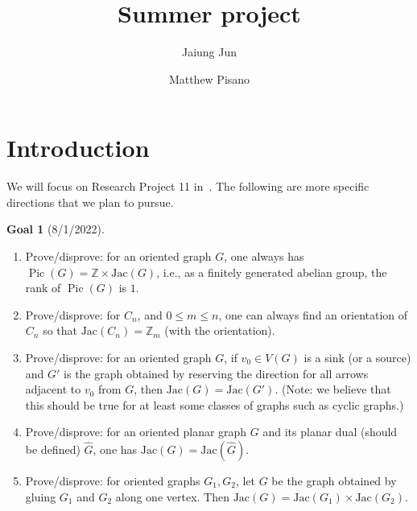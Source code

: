 \documentclass[11pt,reqno]{amsart}
\DeclareMathOperator{\Pic}{Pic}
\newcommand{\Jac}{\textrm{Jac}}{}
\theoremstyle{definition}
\newtheorem*{goal}{\textbf{Goal}}
\theoremstyle{plain}
\begin{document}
\title{Summer project}
%

\author{Jaiung Jun}
\address{Department of Mathematics, State University of New York at New Paltz, NY 12561, USA}

\author{Matthew Pisano}
\address{State University of New York at Binghamton, NY 13902, USA}


%

%
\makeatletter
{}
\makeatother


\begin{abstract}

\end{abstract}

\maketitle


\section{Introduction}

	We will focus on Research Project 11 in~\cite{glass2020chip}.
	The following are more specific directions that we plan to pursue.

	\begin{goal}[8/1/2022]$ $
		\begin{enumerate}
			\item
			Prove/disprove: for an oriented graph $G$, one always has $\Pic(G)=\mathbb{Z} \times \Jac(G)$,
			i.e., as a finitely generated abelian group, the rank of $\Pic(G)$ is $1$.
			\item
			Prove/disprove: for $C_n$, and $0 \leq m \leq n$, one can always find an orientation
			of $C_n$ so that $\Jac(C_n)=\mathbb{Z}_m$ (with the orientation).
			\item
			Prove/disprove: for an oriented graph $G$, if $v_0 \in V(G)$ is a sink (or a source)
			and $G'$ is the graph obtained by reserving the direction for all arrows adjacent
			to $v_0$ from $G$, then $\Jac(G)=\Jac(G')$. (Note: we believe that this should be true
			for at least some classes of graphs such as cyclic graphs.)
			\item
			Prove/disprove: for an oriented planar graph $G$ and its planar dual (should be defined)
			$\hat{G}$, one has $\Jac(G)=\Jac(\hat{G})$.
			\item
			Prove/disprove: for oriented graphs $G_1,G_2$, let $G$ be the graph obtained by
			gluing $G_1$ and $G_2$ along one vertex. Then $\Jac(G)=\Jac(G_1) \times \Jac(G_2)$.
		\end{enumerate}
	\end{goal}
\end{document}
